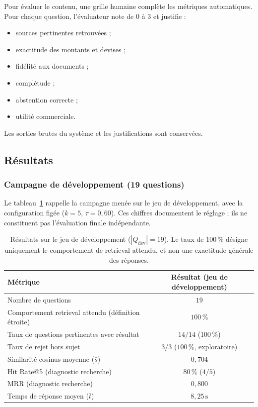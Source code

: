 Pour évaluer le contenu, une grille humaine complète les métriques automatiques.
Pour chaque question, l'évaluateur note de 0 à 3 et justifie :
\begin{itemize}
    \item sources pertinentes retrouvées ;
    \item exactitude des montants et devises ;
    \item fidélité aux documents ;
    \item complétude ;
    \item abstention correcte ;
    \item utilité commerciale.
\end{itemize}
Les sorties brutes du système et les justifications sont conservées.

\subsection{Résultats}

\subsubsection{Campagne de développement (19 questions)}

Le tableau~\ref{tab:resultats-dev} rappelle la campagne menée sur le jeu de
développement, avec la configuration figée ($k = 5$, $\tau = 0{,}60$). Ces
chiffres documentent le réglage ; ils ne constituent pas l'évaluation finale
indépendante.

\begin{table}[H]
\centering
\begingroup
{}
\begin{tabular}{|l|c|}
\hline
\textbf{Métrique} & \textbf{Résultat (jeu de développement)} \\
\hline
Nombre de questions & $19$ \\
\hline
Comportement retrieval attendu
  (définition étroite) & $100\,\%$ \\
\hline
Taux de questions pertinentes avec résultat & $14/14$ ($100\,\%$) \\
\hline
Taux de rejet hors sujet & $3/3$ ($100\,\%$, exploratoire) \\
\hline
Similarité cosinus moyenne ($\bar{s}$) & $0{,}704$ \\
\hline
Hit Rate@5 (diagnostic recherche) & $80\,\%$ ($4/5$) \\
\hline
MRR (diagnostic recherche) & $0{,}800$ \\
\hline
Temps de réponse moyen ($\bar{t}$) & $8{,}25\,\text{s}$ \\
\hline
\end{tabular}
\endgroup
\caption{Résultats sur le jeu de développement ($|Q_{\text{dev}}|=19$).
Le taux de $100\,\%$ désigne uniquement le comportement de retrieval attendu,
et non une exactitude générale des réponses.}
\label{tab:resultats-dev}
\end{table}

